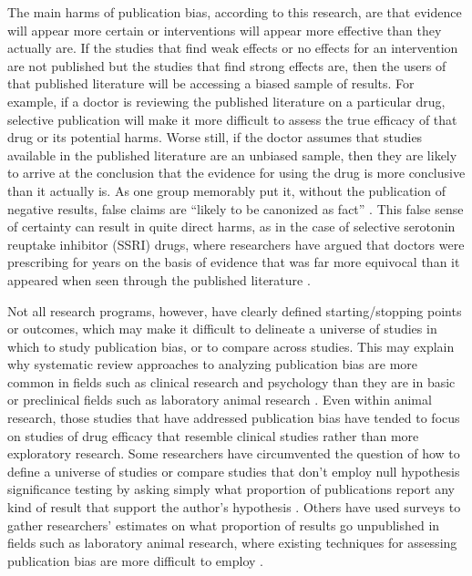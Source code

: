 \documentclass[twocolumn, serif, meta, authordate]{jote-article}
\begin{document}
The main harms of publication bias, according to this research, are that evidence will appear more certain or interventions will appear more effective than they actually are. If the studies that find weak effects or no effects for an intervention are not published but the studies that find strong effects are, then the users of that published literature will be accessing a biased sample of results. For example, if a doctor is reviewing the published literature on a particular drug, selective publication will make it more difficult to assess the true efficacy of that drug or its potential harms. Worse still, if the doctor assumes that studies available in the published literature are an unbiased sample, then they are likely to arrive at the conclusion that the evidence for using the drug is more conclusive than it actually is. As one group memorably put it, without the publication of negative results, false claims are ``likely to be canonized as fact'' \parencite{Nissen2016}. This false sense of certainty can result in quite direct harms, as in the case of selective serotonin reuptake inhibitor (SSRI) drugs, where researchers have argued that doctors were prescribing for years on the basis of evidence that was far more equivocal than it appeared when seen through the published literature \parencite{Melander2003, Turner2008}.

Not all research programs, however, have clearly defined starting/stopping points or outcomes, which may make it difficult to delineate a universe of studies in which to study publication bias, or to compare across studies. This may explain why systematic review approaches to analyzing publication bias are more common in fields such as clinical research and psychology than they are in basic or preclinical fields such as laboratory animal research \parencite{Korevaar2011}. Even within animal research, those studies that have addressed publication bias have tended to focus on studies of drug efficacy that resemble clinical studies \parencite{Macleod2004, Sena2010} rather than more exploratory research. Some researchers have circumvented the question of how to define a universe of studies or compare studies that don't employ null hypothesis significance testing by asking simply what proportion of publications report any kind of result that support the author's hypothesis \parencite{Fanelli2010, Fanelli2012}. Others have used surveys to gather researchers' estimates on what proportion of results go unpublished in fields such as laboratory animal research, where existing techniques for assessing publication bias are more difficult to employ \parencite{Riet2012}.
\end{document}
